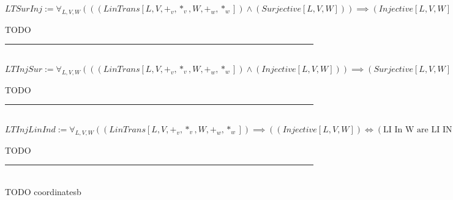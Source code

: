 \documentclass{book}
\newcommand{\abr}{:=}
\begin{document}
$LTSurInj \abr \forall_{L, V, W}(((LinTrans[L, V, +_v, *_v, W, +_w, *_w]) \land (Surjective[L, V, W])) \implies (Injective[L, V, W]))$
\begin{enumerate}
  \lit TODO
\end{enumerate} \vspace{.75mm} \hrule \vspace{.75mm} \ \\ 

$LTInjSur \abr \forall_{L, V, W}(((LinTrans[L, V, +_v, *_v, W, +_w, *_w]) \land (Injective[L, V, W])) \implies (Surjective[L, V, W]))$
\begin{enumerate}
  \lit TODO
\end{enumerate} \vspace{.75mm} \hrule \vspace{.75mm} \ \\ 

$LTInjLinInd \abr \forall_{L, V, W}((LinTrans[L, V, +_v, *_v, W, +_w, *_w]) \implies ((Injective[L, V, W]) \iff (\text{LI In W are LI IN V})))$
\begin{enumerate}
  \lit TODO
\end{enumerate} \vspace{.75mm} \hrule \vspace{.75mm} \ \\ 

TODO coordinatesb




\end{document}
